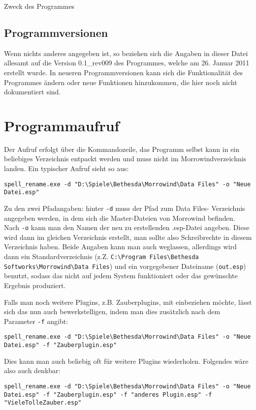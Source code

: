 \documentclass[12pt,oneside,a4paper]{article}
\begin{document}
\begin{section}{Zweck des Programmes}
\subsection{Programmversionen}
Wenn nichts anderes angegeben ist, so beziehen sich die Angaben in dieser Datei
allesamt auf die Version 0.1\_rev009 des Programmes, welche am 26. Januar 2011
erstellt wurde. In neueren Programmversionen kann sich die Funktionalit\"{a}t des
Programmes \"{a}ndern oder neue Funktionen hinzukommen, die hier noch nicht
dokumentiert sind.
\end{section}

\section{Programmaufruf}
Der Aufruf erfolgt \"{u}ber die Kommandozeile, das Programm selbst kann in ein
beliebiges Verzeichnis entpackt werden und muss nicht im Morrowindverzeichnis
landen. Ein typischer Aufruf sieht so aus:

\texttt{spell\_rename.exe -d "D:\textbackslash{}Spiele\textbackslash{}Bethesda\textbackslash{}Morrowind\textbackslash{}Data Files" -o "Neue Datei.esp"}

Zu den zwei Pfadangaben: hinter \texttt{-d} muss der Pfad zum Data Files-
Verzeichnis angegeben werden, in dem sich die Master-Dateien von Morrowind befinden.
Nach \texttt{-o} kann man den Namen der neu zu erstellenden .esp-Datei angeben.
Diese wird dann im gleichen Verzeichnis erstellt, man sollte also Schreibrechte
in diesem Verzeichnis haben. Beide Angaben kann man auch weglassen, allerdings
wird dann ein Standardverzeichnis (z.Z. \texttt{C:\textbackslash{}Program Files\textbackslash{}Bethesda Softworks\textbackslash{}Morrowind\textbackslash{}Data Files})
und ein vorgegebener Dateiname (\texttt{out.esp}) benutzt, sodass das nicht auf
jedem System funktioniert oder das gew\"{u}nschte Ergebnis produziert.

Falls man noch weitere Plugins, z.B. Zauberplugins, mit einbeziehen m\"{o}chte,
l\"{a}sst sich das nun auch bewerkstelligen, indem man dies zus\"{a}tzlich nach
dem Parameter \texttt{-f} angibt:

\texttt{spell\_rename.exe -d "D:\textbackslash{}Spiele\textbackslash{}Bethesda\textbackslash{}Morrowind\textbackslash{}Data Files" -o "Neue Datei.esp" -f "Zauberplugin.esp"}

Dies kann man auch beliebig oft f\"{u}r weitere Plugins wiederholen.
Folgendes w\"{a}re also auch denkbar:

\texttt{spell\_rename.exe -d "D:\textbackslash{}Spiele\textbackslash{}Bethesda\textbackslash{}Morrowind\textbackslash{}Data Files" -o "Neue Datei.esp" -f "Zauberplugin.esp" -f "anderes Plugin.esp" -f "VieleTolleZauber.esp"}
\end{document}
